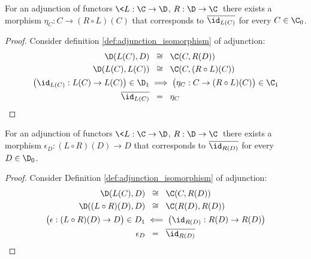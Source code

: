 \begin{theorem}
  For an adjunction of functors $\<L: \C \to \D$, $R:\D\to \C\>$
  there exists a morphism ${\eta_C: C\to (R\circ L)(C)}$ that corresponds to
  $\overline{\id_{L(C)}}$ for every $C\in \C_0$.

  \begin{proof}
    Consider definition \ref{def:adjunction_isomorphism} of adjunction:
    \[
      \begin{aligned}
        \D(L(C), D) &\ \:\cong\ \: \C(C, R(D))\\
        \D(L(C), L(C)) &\ \:\cong\ \: \C(C, (R\circ L)(C))\\
        \big(\id_{L(C)}: L(C) \to L(C)\big) \in \D_1
        &\implies \big(\eta_C : C \to (R\circ L)(C)\big)\in \C_1\\
        \overline{\id_{L(C)}} &\ \:=\ \:\eta_C
      \end{aligned}
    \]
  \end{proof}
  \vspace{-1.5\baselineskip}
\end{theorem}

\begin{theorem}
  For an adjunction of functors $\<L: \C \to \D$, $R:\D\to \C\>$
  there exists a morphism ${\epsilon_D: (L\circ R)(D)\to D}$ that corresponds to
  $\overline{\id_{R(D)}}$ for every $D\in \D_0$.

  \begin{proof}
    Consider Definition \ref{def:adjunction_isomorphism} of adjunction:
    \[
      \begin{aligned}
        \D(L(C), D) &\ \:\cong\ \: \C(C, R(D))\\
        \D((L\circ R)(D), D) &\ \:\cong\ \: \C(R(D), R(D))\\
        \big(\epsilon:(L\circ R)(D)\to D\big)\in D_1 &\impliedby
          \big(\id_{R(D)}: R(D) \to R(D)\big)\\
        \epsilon_D &\ \:=\ \:\overline{\id_{R(D)}}
      \end{aligned}
    \]
  \end{proof}
  \vspace{-1.5\baselineskip}
\end{theorem}